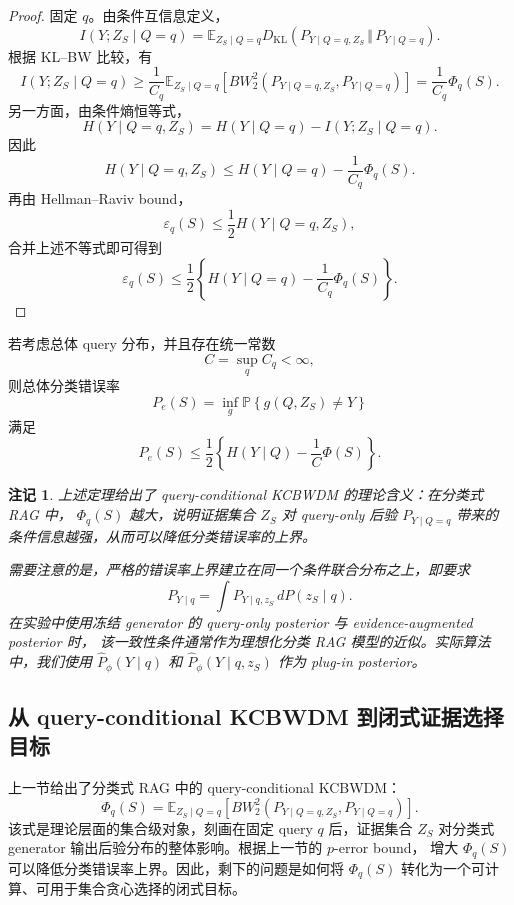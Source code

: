\documentclass[UTF8,a4paper,12pt,oneside]{ctexart}
\newtheorem{remark}{注记}
\numberwithin{equation}{section}
\begin{document}
\begin{proof}
固定 \(q\)。由条件互信息定义，
\[
    I(Y;Z_S\mid Q=q)
    =
    \mathbb E_{Z_S\mid Q=q}
    D_{\mathrm{KL}}
    \left(
        P_{Y\mid Q=q,Z_S}
        \,\Vert\,
        P_{Y\mid Q=q}
    \right).
\]
根据 KL--BW 比较，有
\[
    I(Y;Z_S\mid Q=q)
    \ge
    \frac{1}{C_q}
    \mathbb E_{Z_S\mid Q=q}
    \left[
        BW_2^2
        \left(
            P_{Y\mid Q=q,Z_S},
            P_{Y\mid Q=q}
        \right)
    \right]
    =
    \frac{1}{C_q}\Phi_q(S).
\]
另一方面，由条件熵恒等式，
\[
    H(Y\mid Q=q,Z_S)
    =
    H(Y\mid Q=q)
    -
    I(Y;Z_S\mid Q=q).
\]
因此
\[
    H(Y\mid Q=q,Z_S)
    \le
    H(Y\mid Q=q)
    -
    \frac{1}{C_q}\Phi_q(S).
\]
再由 Hellman--Raviv bound，
\[
    \varepsilon_q(S)
    \le
    \frac{1}{2}
    H(Y\mid Q=q,Z_S),
\]
合并上述不等式即可得到
\[
    \varepsilon_q(S)
    \le
    \frac{1}{2}
    \left\{
        H(Y\mid Q=q)
        -
        \frac{1}{C_q}\Phi_q(S)
    \right\}.
\]
\end{proof}

若考虑总体 query 分布，并且存在统一常数
\[
    C=\sup_q C_q<\infty,
\]
则总体分类错误率
\[
    P_e(S)
    =
    \inf_g
    \mathbb P
    \left\{
        g(Q,Z_S)\neq Y
    \right\}
\]
满足
\[
    P_e(S)
    \le
    \frac{1}{2}
    \left\{
        H(Y\mid Q)
        -
        \frac{1}{C}
        \Phi(S)
    \right\}.
\]

\begin{remark}
上述定理给出了 query-conditional KCBWDM 的理论含义：在分类式 RAG 中，
\(\Phi_q(S)\) 越大，说明证据集合 \(Z_S\) 对 query-only 后验 \(P_{Y\mid Q=q}\)
带来的条件信息越强，从而可以降低分类错误率的上界。

需要注意的是，严格的错误率上界建立在同一个条件联合分布之上，即要求
\[
    P_{Y\mid q}
    =
    \int P_{Y\mid q,z_S}\,dP(z_S\mid q).
\]
在实验中使用冻结 generator 的 query-only posterior 与 evidence-augmented posterior 时，
该一致性条件通常作为理想化分类 RAG 模型的近似。实际算法中，我们使用
\(\widehat P_\phi(Y\mid q)\) 和 \(\widehat P_\phi(Y\mid q,z_S)\)
作为 plug-in posterior。
\end{remark}

\subsection{从 query-conditional KCBWDM 到闭式证据选择目标}
\label{subsec:rag-cbwdm-closed-form}

上一节给出了分类式 RAG 中的 query-conditional KCBWDM：
\[
    \Phi_q(S)
    =
    \mathbb E_{Z_S\mid Q=q}
    \left[
        BW_2^2
        \left(
            P_{Y\mid Q=q,Z_S},
            P_{Y\mid Q=q}
        \right)
    \right].
\]
该式是理论层面的集合级对象，刻画在固定 query \(q\) 后，证据集合 \(Z_S\)
对分类式 generator 输出后验分布的整体影响。根据上一节的 \(p\)-error bound，
增大 \(\Phi_q(S)\) 可以降低分类错误率上界。因此，剩下的问题是如何将
\(\Phi_q(S)\) 转化为一个可计算、可用于集合贪心选择的闭式目标。
\end{document}

